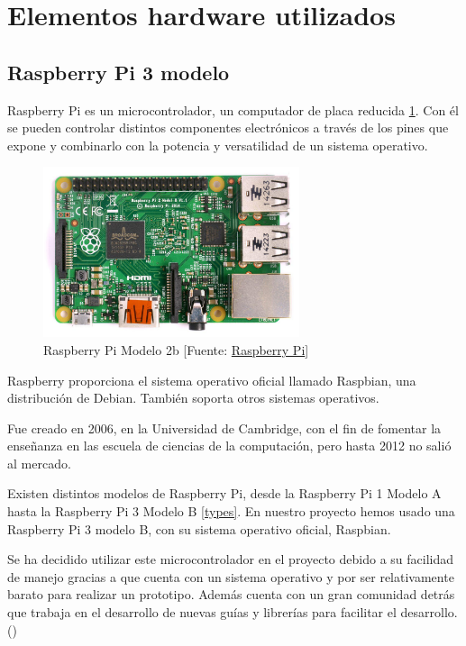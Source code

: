 \section{Elementos hardware utilizados}
\label{makereference2.3}

\subsection{Raspberry Pi 3 modelo}
\label{makereference2.3.1}

Raspberry Pi es un microcontrolador, un computador de placa reducida \ref{rasp}. Con él se pueden controlar distintos componentes electrónicos a través de los pines que expone y combinarlo con la potencia y versatilidad de un sistema operativo.

\begin{figure}[htb]
	\begin{center}
		\includegraphics[height=5cm]{figures/Raspberry_Pi.jpg}
		\caption{Raspberry Pi Modelo 2b [Fuente: \href{https://www.raspberrypi.org}{Raspberry Pi}]}
	\end{center}
	
	\label{rasp}
\end{figure}

Raspberry proporciona el sistema operativo oficial llamado Raspbian, una distribución de Debian. También soporta otros sistemas operativos.
 
Fue creado en 2006, en la Universidad de Cambridge, con el fin de fomentar la enseñanza en las escuela de ciencias de la computación, pero hasta 2012 no salió al mercado.

Existen distintos modelos de Raspberry Pi, desde la Raspberry Pi 1 Modelo A hasta la Raspberry Pi 3 Modelo B \ref{types}.
En nuestro proyecto hemos usado una Raspberry Pi 3 modelo B, con su sistema operativo oficial, Raspbian.

Se ha decidido utilizar este microcontrolador en el proyecto debido a su facilidad de manejo gracias a que cuenta con un sistema operativo y por ser relativamente barato para realizar un prototipo. Además cuenta con un gran comunidad detrás que trabaja en el desarrollo de nuevas guías y librerías para facilitar el desarrollo. (\cite{ARP:RaspberryPi:2017})

